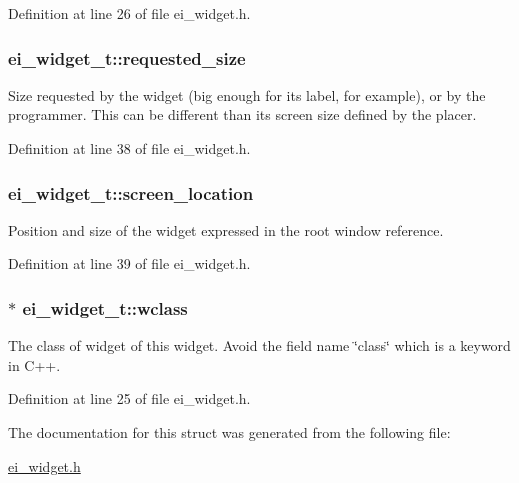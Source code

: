 Definition at line 26 of file ei\+\_\+widget.\+h.

\hypertarget{structei__widget__t_ae82b19958b3ec72a855986dffb9b92ea}{
\subsubsection[{requested\+\_\+size}]{ ei\+\_\+widget\+\_\+t\+::requested\+\_\+size}}\label{structei__widget__t_ae82b19958b3ec72a855986dffb9b92ea}


Size requested by the widget (big enough for its label, for example), or by the programmer. This can be different than its screen size defined by the placer. 



Definition at line 38 of file ei\+\_\+widget.\+h.

\hypertarget{structei__widget__t_ad139e1541329b54e0b4c8d746e14b204}{
\subsubsection[{screen\+\_\+location}]{ ei\+\_\+widget\+\_\+t\+::screen\+\_\+location}}\label{structei__widget__t_ad139e1541329b54e0b4c8d746e14b204}


Position and size of the widget expressed in the root window reference. 



Definition at line 39 of file ei\+\_\+widget.\+h.

\hypertarget{structei__widget__t_a429e970e1d266252df4dbe55296b9f70}{
\subsubsection[{wclass}]{$\ast$ ei\+\_\+widget\+\_\+t\+::wclass}}\label{structei__widget__t_a429e970e1d266252df4dbe55296b9f70}


The class of widget of this widget. Avoid the field name \char`\"{}class\char`\"{} which is a keyword in C++. 



Definition at line 25 of file ei\+\_\+widget.\+h.



The documentation for this struct was generated from the following file\+:\begin{DoxyCompactItemize}
\item 
\hyperlink{ei__widget_8h}{ei\+\_\+widget.\+h}\end{DoxyCompactItemize}

